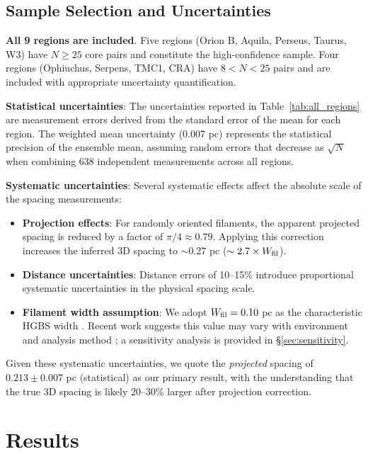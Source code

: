 \documentclass[11pt,a4paper]{article}
\begin{document}
\subsection{Sample Selection and Uncertainties}

\textbf{All 9 regions are included}. Five regions (Orion B, Aquila, Perseus, Taurus, W3) have $N \geq 25$ core pairs and constitute the high-confidence sample. Four regions (Ophiuchus, Serpens, TMC1, CRA) have $8 < N < 25$ pairs and are included with appropriate uncertainty quantification.

\textbf{Statistical uncertainties}: The uncertainties reported in Table~\ref{tab:all_regions} are measurement errors derived from the standard error of the mean for each region. The weighted mean uncertainty (0.007 pc) represents the statistical precision of the ensemble mean, assuming random errors that decrease as $\sqrt{N}$ when combining 638 independent measurements across all regions.

\textbf{Systematic uncertainties}: Several systematic effects affect the absolute scale of the spacing measurements:
\begin{itemize}
    \item \textbf{Projection effects}: For randomly oriented filaments, the apparent projected spacing is reduced by a factor of $\pi/4 \approx 0.79$. Applying this correction increases the inferred 3D spacing to $\sim0.27$ pc ($\sim2.7\times W_{\rm fil}$).
    \item \textbf{Distance uncertainties}: Distance errors of 10--15\% introduce proportional systematic uncertainties in the physical spacing scale.
    \item \textbf{Filament width assumption}: We adopt $W_{\rm fil} = 0.10$ pc as the characteristic HGBS width \citep{Arzoumanian2011}. Recent work suggests this value may vary with environment and analysis method \citep{Panopoulou2022, Hacar2023}; a sensitivity analysis is provided in \S\ref{sec:sensitivity}.
\end{itemize}

Given these systematic uncertainties, we quote the \textit{projected} spacing of $0.213 \pm 0.007$ pc (statistical) as our primary result, with the understanding that the true 3D spacing is likely 20--30\% larger after projection correction.

\section{Results}
\end{document}
